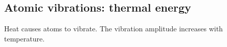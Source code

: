 % 
% 
% 

\subsection{Atomic vibrations: thermal energy}
\label{sec:thermal-energy-distribution}
\label{sec:atomic-electronic-energy}
\label{sec:electronic-energy}

Heat causes atoms to vibrate.  The vibration amplitude increases with
temperature.

